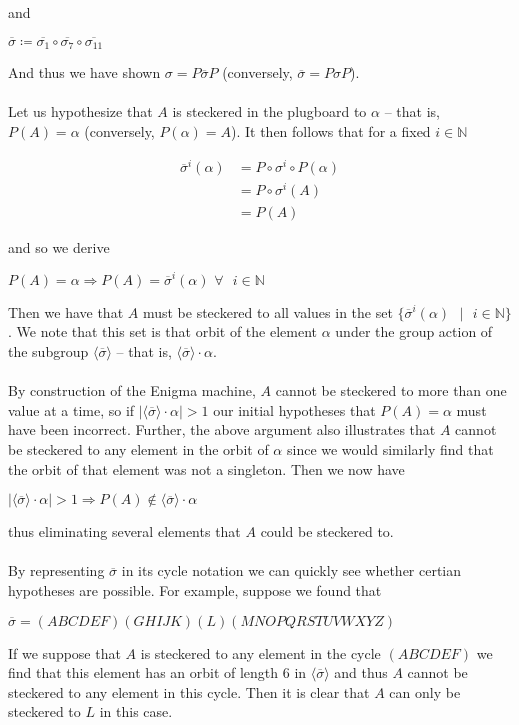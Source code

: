and
\begin{center}
  $\overline{\sigma} \coloneq
  \overline{\sigma_{1}}\circ\overline{\sigma_7}\circ\overline{\sigma_{11}}$
\end{center}
And thus we have shown $\sigma = P\overline{\sigma}P$ (conversely,
$\overline\sigma = P\sigma P$).
\\\\Let us hypothesize that $A$ is steckered in the plugboard to
$\alpha$ -- that is, $P(A) = \alpha$ (conversely, $P(\alpha) = A$).
It then follows that for a fixed $i\in\mathbb{N}$
\begin{center}
  \begin{align*}
    \overline{\sigma}^i(\alpha) &= P\circ\sigma^i\circ P(\alpha)
    \\&= P\circ\sigma^i(A)
    \\&= P(A)
  \end{align*}
\end{center}
and so we derive
\begin{center}
  $P(A) = \alpha \Rightarrow P(A) = \overline{\sigma}^i(\alpha)\text{
  }\forall\text{ }i\in\mathbb{N}$
\end{center}
Then we have that $A$ must be steckered to all values in the set
$\{\overline{\sigma}^i(\alpha)\text{ }\vert\text{ }i\in\mathbb{N}\}$.
We note that this set is that orbit of the element $\alpha$ under the
group action of the subgroup $\langle\overline{\sigma}\rangle$ -- that is,
$\langle\overline{\sigma}\rangle\cdot\alpha$.
\\\\By construction of the Enigma machine, $A$ cannot be steckered to
more than one value at a time, so if
$|\langle\overline{\sigma}\rangle\cdot\alpha| > 1$ our initial
hypotheses that $P(A) = \alpha$ must have been incorrect. Further,
the above argument also illustrates that $A$ cannot be steckered to
any element in the orbit of $\alpha$ since
we would similarly find that the orbit of that element was not a
singleton. Then we now have
\begin{center}
  $|\langle\overline{\sigma}\rangle\cdot\alpha| > 1 \Rightarrow P(A)
  \notin \langle\overline{\sigma}\rangle\cdot\alpha$
\end{center}
thus eliminating several elements that $A$ could be steckered to.
\\\\By representing $\overline\sigma$ in its cycle notation we can
quickly see whether certian hypotheses are possible. For example,
suppose we found that
\begin{center}
  $\overline\sigma = (ABCDEF)(GHIJK)(L)(MNOPQRSTUVWXYZ)$
\end{center}
If we suppose that $A$ is steckered to any element in the cycle
$(ABCDEF)$ we find that this
element has an orbit of length $6$ in $\langle\overline\sigma\rangle$
and thus $A$ cannot be steckered
to any element in this cycle. Then it is clear that $A$ can only be
steckered to $L$ in this case.
